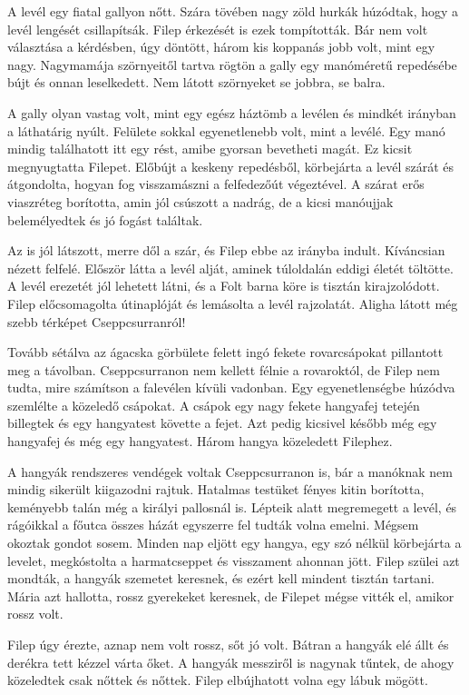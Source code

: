\documentclass[10pt]{memoir}
\begin{document}
A levél egy fiatal gallyon nőtt. Szára tövében nagy zöld hurkák húzódtak, hogy
a levél lengését csillapítsák. Filep érkezését is ezek tompították. Bár nem
volt választása a kérdésben, úgy döntött, három kis koppanás jobb volt, mint
egy nagy. Nagymamája szörnyeitől tartva rögtön a gally egy manóméretű
repedésébe bújt és onnan leselkedett. Nem látott szörnyeket se jobbra, se
balra.

A gally olyan vastag volt, mint egy egész háztömb a levélen és mindkét irányban
a láthatárig nyúlt. Felülete sokkal egyenetlenebb volt, mint a levélé. Egy manó
mindig találhatott itt egy rést, amibe gyorsan bevetheti magát. Ez kicsit
megnyugtatta Filepet. Előbújt a keskeny repedésből, körbejárta a levél szárát
és átgondolta, hogyan fog visszamászni a felfedezőút végeztével. A szárat erős
viaszréteg borította, amin jól csúszott a nadrág, de a kicsi manóujjak
belemélyedtek és jó fogást találtak.

Az is jól látszott, merre dől a szár, és Filep ebbe az irányba indult.
Kíváncsian nézett felfelé. Először látta a levél alját, aminek túloldalán
eddigi életét töltötte. A levél erezetét jól lehetett látni, és a Folt barna
köre is tisztán kirajzolódott. Filep előcsomagolta útinaplóját és lemásolta a
levél rajzolatát. Aligha látott még szebb térképet Cseppcsurranról!

Tovább sétálva az ágacska görbülete felett ingó fekete rovarcsápokat pillantott
meg a távolban. Cseppcsurranon nem kellett félnie a rovaroktól, de Filep nem
tudta, mire számítson a falevélen kívüli vadonban. Egy egyenetlenségbe húzódva
szemlélte a közeledő csápokat. A csápok egy nagy fekete hangyafej tetején
billegtek és egy hangyatest követte a fejet. Azt pedig kicsivel később még egy
hangyafej és még egy hangyatest. Három hangya közeledett Filephez.

A hangyák rendszeres vendégek voltak Cseppcsurranon is, bár a manóknak nem
mindig sikerült kiigazodni rajtuk. Hatalmas testüket fényes kitin borította,
keményebb talán még a királyi pallosnál is. Lépteik alatt megremegett a levél,
és rágóikkal a főutca összes házát egyszerre fel tudták volna emelni. Mégsem
okoztak gondot sosem. Minden nap eljött egy hangya, egy szó nélkül körbejárta a
levelet, megkóstolta a harmatcseppet és visszament ahonnan jött. Filep szülei
azt mondták, a hangyák szemetet keresnek, és ezért kell mindent tisztán
tartani. Mária azt hallotta, rossz gyerekeket keresnek, de Filepet mégse vitték
el, amikor rossz volt.

Filep úgy érezte, aznap nem volt rossz, sőt jó volt. Bátran a hangyák elé állt
és derékra tett kézzel várta őket. A hangyák messziről is nagynak tűntek, de
ahogy közeledtek csak nőttek és nőttek. Filep elbújhatott volna egy lábuk
mögött.
\end{document}
